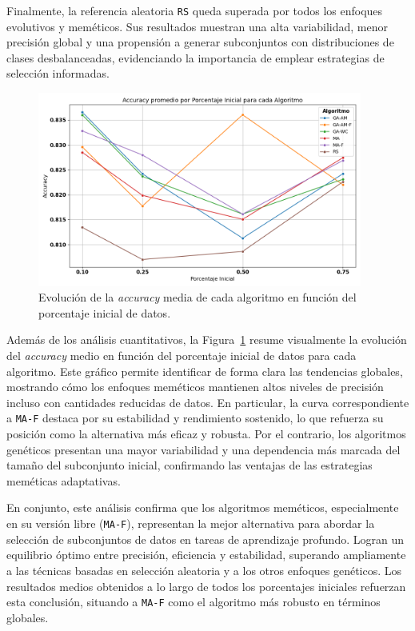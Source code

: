 Finalmente, la referencia aleatoria \texttt{RS} queda superada por todos los enfoques evolutivos y meméticos.
Sus resultados muestran una alta variabilidad, menor precisión global y una propensión a generar subconjuntos con distribuciones de clases desbalanceadas,
evidenciando la importancia de emplear estrategias de selección informadas.

\begin{figure}[htp]
  \centering
  \includegraphics[width=0.95\textwidth]{imagenes/evaluaciones/final/lineplot-por-porcentaje.png}
  \caption{Evolución de la \textit{accuracy} media de cada algoritmo en función del porcentaje inicial de datos.}
  \label{fig:lineplot-por-porcentaje}
\end{figure}

Además de los análisis cuantitativos, la Figura~\ref{fig:lineplot-por-porcentaje} 
resume visualmente la evolución del \textit{accuracy} medio en función del porcentaje inicial de datos para cada algoritmo.
Este gráfico permite identificar de forma clara las tendencias globales,
 mostrando cómo los enfoques meméticos mantienen altos niveles de precisión incluso con cantidades reducidas de datos.
En particular, la curva correspondiente a \texttt{MA-F} destaca por su estabilidad y rendimiento sostenido, 
lo que refuerza su posición como la alternativa más eficaz y robusta.
Por el contrario, los algoritmos genéticos presentan una mayor variabilidad y una dependencia más marcada del tamaño del subconjunto inicial, 
confirmando las ventajas de las estrategias meméticas adaptativas.


En conjunto, este análisis confirma que los algoritmos meméticos, especialmente en su versión libre (\texttt{MA-F}),
representan la mejor alternativa para abordar la selección de subconjuntos de datos en tareas de aprendizaje profundo.
Logran un equilibrio óptimo entre precisión, eficiencia y estabilidad, superando ampliamente a las técnicas basadas en selección aleatoria y a los otros enfoques genéticos.
Los resultados medios obtenidos a lo largo de todos los porcentajes iniciales refuerzan esta conclusión, situando a \texttt{MA-F} como el algoritmo más robusto en términos globales.

